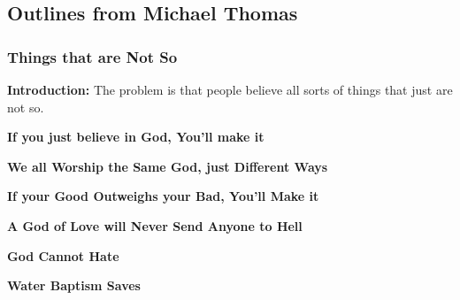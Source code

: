 \subsection{Outlines from Michael Thomas}

\subsubsection{Things that are Not So}
\textbf{Introduction:} The problem is that people believe all sorts of things that just are not so.
\begin{compactenum}[I.]
    \item \textbf{If you just believe in God, You'll make it} %
    \item \textbf{We all Worship the Same God, just Different Ways}
    \item \textbf{If your Good Outweighs your Bad, You'll Make it}
    \item \textbf{A God of Love will Never Send Anyone to Hell}
    \item \textbf{God Cannot Hate}
    \item \textbf{Water Baptism Saves}
\end{compactenum}

